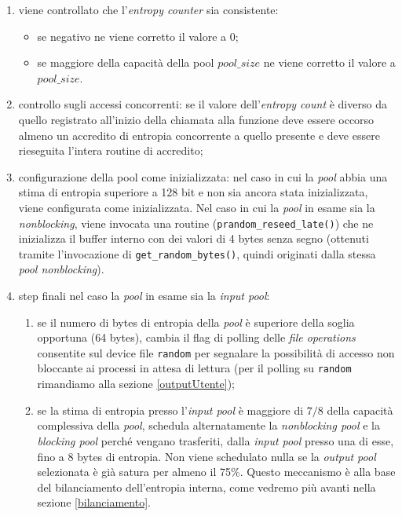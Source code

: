 \documentclass{article}
\begin{document}
\begin{enumerate}
   \item viene controllato che l'\emph{entropy counter} sia consistente: 
	\begin {itemize}
	  \item se negativo ne viene corretto il valore a 0;
	  \item se maggiore della capacità della pool $pool\_size$ ne viene corretto
	  il valore a $pool\_size$.
	\end{itemize}
   \item controllo sugli accessi concorrenti: se il valore dell'\emph{entropy
   count} è diverso da quello registrato all'inizio della chiamata alla funzione
   deve essere occorso almeno un accredito di entropia concorrente a quello
   presente e deve essere rieseguita l'intera routine di accredito;
   \item configurazione della pool come inizializzata: nel caso in cui la
   \emph{pool} abbia una stima di entropia superiore a 128 bit e non sia ancora
   stata inizializzata, viene configurata come inizializzata. Nel caso in cui la
   \emph{pool} in esame sia la \emph{nonblocking}, viene invocata una routine
   (\verb+prandom_reseed_late()+) che ne inizializza il buffer interno con dei
   valori di 4 bytes senza segno (ottenuti tramite l'invocazione di
   \verb+get_random_bytes()+, quindi originati dalla stessa \emph{pool
   nonblocking}).
   \item step finali nel caso la \emph{pool} in esame sia la \emph{input pool}: 
       \begin{enumerate}
         \item se il numero di bytes di entropia della \emph{pool} è superiore
         della soglia opportuna (64 bytes), cambia il flag di polling delle
         \emph{file operations} consentite sul device file \verb+random+ per
         segnalare la possibilità di accesso non bloccante ai processi in attesa
         di lettura (per il polling su \verb+random+ rimandiamo alla sezione
         \ref{outputUtente});
         \item se la stima di entropia presso l'\emph{input pool} è maggiore di
         $7/8$ della capacità complessiva della \emph{pool}, schedula
         alternatamente la \emph{nonblocking pool} e la \emph{blocking pool}
         perché vengano trasferiti, dalla \emph{input pool} presso una di esse,
         fino a 8 bytes di entropia. Non viene schedulato nulla se la
         \emph{output pool} selezionata è già satura per almeno il 75\%. Questo
         meccanismo è alla base del bilanciamento dell'entropia interna, come
         vedremo più avanti nella sezione \ref{bilanciamento}.
       \end{enumerate}
   
   \end{enumerate}
 
\end{document}
